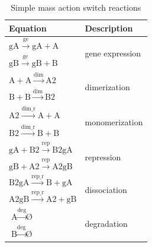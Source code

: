 \begin{table}[tb]
\centering
\caption{Simple mass action switch reactions}
\label{tab:simp-ma-equ}
\begin{tabular}{@{}ll@{}}
\toprule
Equation                                                                             & Description                      \\ \midrule
$\textrm{gA}\stackrel{\textrm{ge}}{\longrightarrow}\textrm{gA} + \textrm{A}$                                             & \multirow{2}{*}{gene expression} \\
$\textrm{gB}\stackrel{\textrm{ge}}{\longrightarrow}\textrm{gB} + \textrm{B}$                                             &                                  \\
$\textrm{A} + \textrm{A} \stackrel{\textrm{dim}}{\longrightarrow}\textrm{A2}$        & \multirow{2}{*}{dimerization}    \\
$\textrm{B} + \textrm{B} \stackrel{\textrm{dim}}{\longrightarrow} \textrm{B2}$       &                                  \\
$\textrm{A2} \stackrel{\textrm{dim\_r}}{\longrightarrow}\textrm{A} + \textrm{A}$     & \multirow{2}{*}{monomerization}  \\
$\textrm{B2} \stackrel{\textrm{dim\_r}}{\longrightarrow}\textrm{B} + \textrm{B}$     &                                  \\
$\textrm{gA} + \textrm{B2} \stackrel{\textrm{rep}}{\longrightarrow}\textrm{B2gA}$    & \multirow{2}{*}{repression}      \\
$\textrm{gB} + \textrm{A2} \stackrel{\textrm{rep}}{\longrightarrow}\textrm{A2gB}$    &                                  \\
$\textrm{B2gA} \stackrel{\textrm{rep\_r}}{\longrightarrow}\textrm{B} + \textrm{gA}$  & \multirow{2}{*}{dissociation}    \\
$\textrm{A2gB} \stackrel{\textrm{rep\_r}}{\longrightarrow}\textrm{A2} + \textrm{gB}$ &                                  \\
$\textrm{A} \stackrel{\textrm{deg}}{\longrightarrow}\textrm{\O}$                     & \multirow{2}{*}{degradation}     \\
$\textrm{B} \stackrel{\textrm{deg}}{\longrightarrow}\textrm{\O}$                     &                                  \\ \cmidrule(r){1-2}
\end{tabular}
\end{table}

